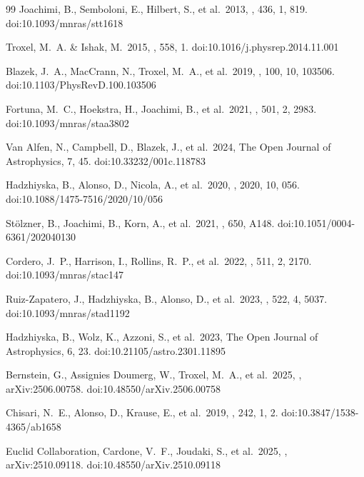 \documentclass[a4paper, 11pt]{article}
\begin{document}
\begin{thebibliography}{99}
 Joachimi, B., Semboloni, E., Hilbert, S., et al.\ 2013, \mnras, 436, 1, 819. doi:10.1093/mnras/stt1618

 Troxel, M.~A. \& Ishak, M.\ 2015, \physrep, 558, 1. doi:10.1016/j.physrep.2014.11.001

 Blazek, J.~A., MacCrann, N., Troxel, M.~A., et al.\ 2019, \prd, 100, 10, 103506. doi:10.1103/PhysRevD.100.103506

 Fortuna, M.~C., Hoekstra, H., Joachimi, B., et al.\ 2021, \mnras, 501, 2, 2983. doi:10.1093/mnras/staa3802

 Van Alfen, N., Campbell, D., Blazek, J., et al.\ 2024, The Open Journal of Astrophysics, 7, 45. doi:10.33232/001c.118783

 Hadzhiyska, B., Alonso, D., Nicola, A., et al.\ 2020, \jcap, 2020, 10, 056. doi:10.1088/1475-7516/2020/10/056

 St{\"o}lzner, B., Joachimi, B., Korn, A., et al.\ 2021, \aap, 650, A148. doi:10.1051/0004-6361/202040130

 Cordero, J.~P., Harrison, I., Rollins, R.~P., et al.\ 2022, \mnras, 511, 2, 2170. doi:10.1093/mnras/stac147

 Ruiz-Zapatero, J., Hadzhiyska, B., Alonso, D., et al.\ 2023, \mnras, 522, 4, 5037. doi:10.1093/mnras/stad1192

 Hadzhiyska, B., Wolz, K., Azzoni, S., et al.\ 2023, The Open Journal of Astrophysics, 6, 23. doi:10.21105/astro.2301.11895

 Bernstein, G., Assignies Doumerg, W., Troxel, M.~A., et al.\ 2025, , arXiv:2506.00758. doi:10.48550/arXiv.2506.00758

 Chisari, N.~E., Alonso, D., Krause, E., et al.\ 2019, \apjs, 242, 1, 2. doi:10.3847/1538-4365/ab1658

 Euclid Collaboration, Cardone, V.~F., Joudaki, S., et al.\ 2025, , arXiv:2510.09118. doi:10.48550/arXiv.2510.09118


\end{thebibliography}
\end{document}
